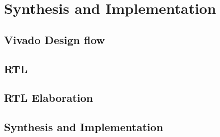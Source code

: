 \chapter{Synthesis and Implementation}

\section{Vivado Design flow}

\section{RTL}

\section{RTL Elaboration}

\section{Synthesis and Implementation}




